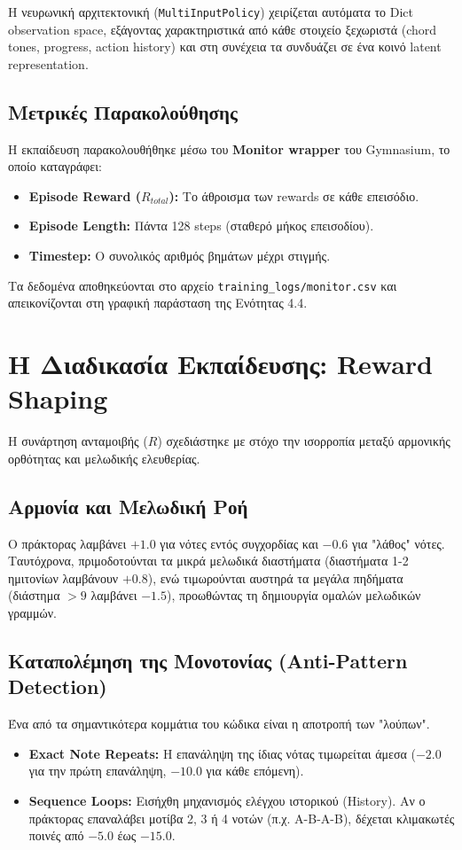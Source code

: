 \documentclass[11pt, a4paper]{article}
\begin{document}
Η νευρωνική αρχιτεκτονική (\texttt{MultiInputPolicy}) χειρίζεται αυτόματα το Dict observation space, εξάγοντας χαρακτηριστικά από κάθε στοιχείο ξεχωριστά (chord tones, progress, action history) και στη συνέχεια τα συνδυάζει σε ένα κοινό latent representation.

\subsection{Μετρικές Παρακολούθησης}
Η εκπαίδευση παρακολουθήθηκε μέσω του \textbf{Monitor wrapper} του Gymnasium, το οποίο καταγράφει:
\begin{itemize}
    \item \textbf{Episode Reward ($R_{total}$):} Το άθροισμα των rewards σε κάθε επεισόδιο.
    \item \textbf{Episode Length:} Πάντα 128 steps (σταθερό μήκος επεισοδίου).
    \item \textbf{Timestep:} Ο συνολικός αριθμός βημάτων μέχρι στιγμής.
\end{itemize}

Τα δεδομένα αποθηκεύονται στο αρχείο \texttt{training\_logs/monitor.csv} και απεικονίζονται στη γραφική παράσταση της Ενότητας 4.4.

\section{Η Διαδικασία Εκπαίδευσης: Reward Shaping}

Η συνάρτηση ανταμοιβής ($R$) σχεδιάστηκε με στόχο την ισορροπία μεταξύ αρμονικής ορθότητας και μελωδικής ελευθερίας.

\subsection{Αρμονία και Μελωδική Ροή}
Ο πράκτορας λαμβάνει $+1.0$ για νότες εντός συγχορδίας και $-0.6$ για "λάθος" νότες. Ταυτόχρονα, πριμοδοτούνται τα μικρά μελωδικά διαστήματα (διαστήματα 1-2 ημιτονίων λαμβάνουν $+0.8$), ενώ τιμωρούνται αυστηρά τα μεγάλα πηδήματα (διάστημα $>9$ λαμβάνει $-1.5$), προωθώντας τη δημιουργία ομαλών μελωδικών γραμμών.

\subsection{Καταπολέμηση της Μονοτονίας (Anti-Pattern Detection)}
Ένα από τα σημαντικότερα κομμάτια του κώδικα είναι η αποτροπή των "λούπων".
\begin{itemize}
    \item \textbf{Exact Note Repeats:} Η επανάληψη της ίδιας νότας τιμωρείται άμεσα ($-2.0$ για την πρώτη επανάληψη, $-10.0$ για κάθε επόμενη).
    \item \textbf{Sequence Loops:} Εισήχθη μηχανισμός ελέγχου ιστορικού (History). Αν ο πράκτορας επαναλάβει μοτίβα 2, 3 ή 4 νοτών (π.χ. A-B-A-B), δέχεται κλιμακωτές ποινές από $-5.0$ έως $-15.0$.
\end{itemize}
\end{document}
